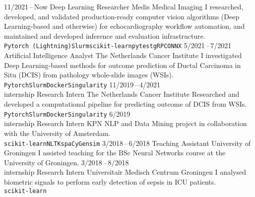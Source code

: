 \documentclass[9pt]{developercv}
\begin{document}
\vspace{.5cm}


\begin{entrylist}
\entry
    {11/2021\,--\,Now}
    {Deep Learning Researcher}
    {Medis Medical Imaging}
    {I researched, developed, and validated production-ready computer vision algorithms (Deep Learning-based and otherwise) for echocardiography workflow automation, and maintained and developed inference and evaluation infrastructure.\\
    \texttt{Pytorch (Lightning)}\slashsepb\texttt{Slurm}\slashsepb\texttt{scikit-learn}\slashsepb\texttt{pytest}\slashsepb\texttt{gRPC}\slashsepb\texttt{ONNX}}
\entry
    {5/2021\,--\,7/2021}
    {Artificial Intelligence Analyst}
    {The Netherlands Cancer Institute}
    {I investigated Deep Learning-based methods for outcome prediction of Ductal Carcinoma in Situ (DCIS) from pathology whole-slide images (WSIs).\\
    \texttt{Pytorch}\slashsepb\texttt{Slurm}\slashsepb\texttt{Docker}\slashsepb\texttt{Singularity}}
\entry
    {11/2019\,--\,4/2021\\\footnotesize{internship}}
    {Research Intern}
    {The Netherlands Cancer Institute}
    {Researched and developed a computational pipeline for predicting outcome of DCIS from WSIs.\\
    \texttt{Pytorch}\slashsepb\texttt{Slurm}\slashsepb\texttt{Docker}\slashsepb\texttt{Singularity}}
\entry
    {6/2019\\\footnotesize{internship}}
    {Research Intern}
    {KPN}
    {NLP and Data Mining project in collaboration with the University of Amsterdam.\\
    \texttt{scikit-learn}\slashsepb\texttt{NLTK}\slashsepb\texttt{spaCy}\slashsepb\texttt{Gensim}}
\entry
    {3/2018\,--\,6/2018}
    {Teaching Assistant}
    {University of Groningen}
    {I assisted teaching for the BSc Neural Networks course at the University of Groningen.}
\entry
    {3/2018\,--\,8/2018\\\footnotesize{internship}}
    {Research Intern}
    {Universitair Medisch Centrum Groningen}
    {I analysed biometric signals to perform early detection of sepsis in ICU patients.\\
    \texttt{scikit-learn}}
\end{entrylist}


\end{document}
